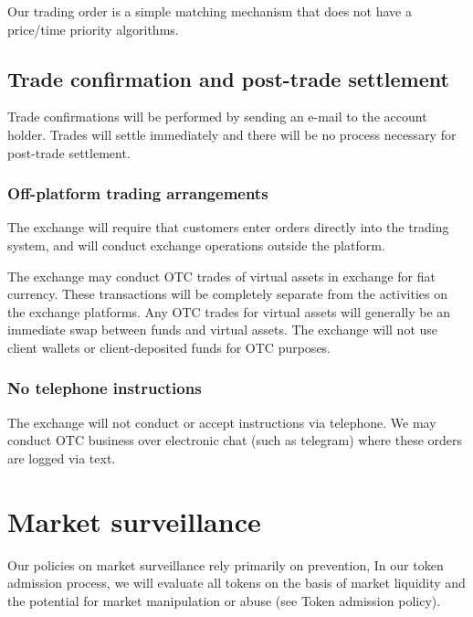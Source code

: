 Our trading order is a simple matching mechanism that does not have a
price/time priority algorithms.


\subsection{Trade confirmation and post-trade settlement}

Trade confirmations will be performed by sending an e-mail to the account holder.  Trades will settle immediately and there will be no
process necessary for post-trade settlement.

\subsubsection{Off-platform trading arrangements}
The exchange will require that customers enter orders directly into
the trading system, and will conduct exchange operations outside
the platform.

The exchange may conduct OTC trades of virtual assets in exchange for
fiat currency.  These transactions will be completely separate from
the activities on the exchange platforms.  Any OTC trades for virtual
assets will generally be an immediate swap between funds
and virtual assets.  The exchange will not use client wallets or
client-deposited funds for OTC purposes.

\subsubsection{No telephone instructions}
The exchange will not conduct or accept instructions via telephone.
We may conduct OTC business over electronic chat (such as telegram) where
these orders are logged via text.

\section{Market surveillance}

Our policies on market surveillance rely primarily on prevention, In
our token admission process, we will evaluate all tokens on the basis
of market liquidity and the potential for market manipulation or abuse
(see Token admission policy).

